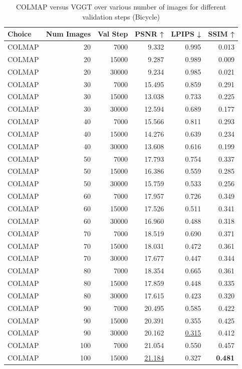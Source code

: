 \begin{table}[H]
\caption{COLMAP versus VGGT over various number of images for different validation steps (Bicycle)}
\label{tab:01_num_images_30000_bicycle}
\begin{tabular}{lrrrrr}
\toprule
Choice & Num Images & Val Step & PSNR ↑ & LPIPS ↓ & SSIM ↑ \\
\midrule
COLMAP & 20 & 7000 & 9.332 & 0.995 & 0.013 \\
COLMAP & 20 & 15000 & 9.287 & 0.989 & 0.009 \\
COLMAP & 20 & 30000 & 9.234 & 0.985 & 0.021 \\
COLMAP & 30 & 7000 & 15.495 & 0.859 & 0.291 \\
COLMAP & 30 & 15000 & 13.038 & 0.733 & 0.225 \\
COLMAP & 30 & 30000 & 12.594 & 0.689 & 0.177 \\
COLMAP & 40 & 7000 & 15.566 & 0.811 & 0.293 \\
COLMAP & 40 & 15000 & 14.276 & 0.639 & 0.234 \\
COLMAP & 40 & 30000 & 13.608 & 0.616 & 0.199 \\
COLMAP & 50 & 7000 & 17.793 & 0.754 & 0.337 \\
COLMAP & 50 & 15000 & 16.386 & 0.559 & 0.285 \\
COLMAP & 50 & 30000 & 15.759 & 0.533 & 0.256 \\
COLMAP & 60 & 7000 & 17.957 & 0.726 & 0.349 \\
COLMAP & 60 & 15000 & 17.526 & 0.511 & 0.341 \\
COLMAP & 60 & 30000 & 16.960 & 0.488 & 0.318 \\
COLMAP & 70 & 7000 & 18.519 & 0.690 & 0.371 \\
COLMAP & 70 & 15000 & 18.031 & 0.472 & 0.361 \\
COLMAP & 70 & 30000 & 17.677 & 0.447 & 0.344 \\
COLMAP & 80 & 7000 & 18.354 & 0.665 & 0.361 \\
COLMAP & 80 & 15000 & 17.859 & 0.448 & 0.335 \\
COLMAP & 80 & 30000 & 17.615 & 0.423 & 0.320 \\
COLMAP & 90 & 7000 & 20.495 & 0.585 & 0.422 \\
COLMAP & 90 & 15000 & 20.391 & 0.355 & 0.425 \\
COLMAP & 90 & 30000 & 20.162 & \underline{0.315} & 0.412 \\
COLMAP & 100 & 7000 & 21.054 & 0.550 & 0.457 \\
COLMAP & 100 & 15000 & \underline{21.184} & 0.327 & \textbf{0.481} \\

\end{tabular}
\end{table}
